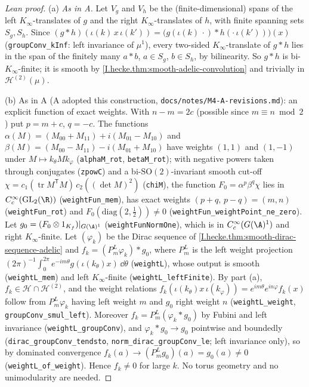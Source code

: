 \begin{proof}[Lean proof]
(a) \emph{As in A.} Let $V_g$ and $V_h$ be the (finite-dimensional) spans of the left $K_\infty$-translates of $g$ and the right $K_\infty$-translates of $h$, with finite spanning sets $S_g,S_h$. Since $(g\ast h)(\iota(k)\,x\,\iota(k'))=\bigl(g(\iota(k)\,\cdot)\ast h(\cdot\,\iota(k'))\bigr)(x)$ (\texttt{groupConv\_kInf}: left invariance of $\mu^1$), every two-sided $K_\infty$-translate of $g\ast h$ lies in the span of the finitely many $a\ast b$, $a\in S_g$, $b\in S_h$, by bilinearity. So $g\ast h$ is bi-$K_\infty$-finite; it is smooth by \cref{I.hecke.thm:smooth-adelic-convolution} and trivially in $\mathcal H^{(2)}(\mu)$.

(b) As in A (A adopted this construction, \texttt{docs/notes/M4-A-revisions.md}): an explicit function of exact weights. With $n-m=2c$ (possible since $m\equiv n \bmod 2$) put $p=m+c$, $q=-c$. The functions $\alpha(M)=(M_{00}+M_{11})+i(M_{01}-M_{10})$ and $\beta(M)=(M_{00}-M_{11})-i(M_{01}+M_{10})$ have weights $(1,1)$ and $(1,-1)$ under $M\mapsto k_\theta Mk_\varphi$ (\texttt{alphaM\_rot}, \texttt{betaM\_rot}); with negative powers taken through conjugates (\texttt{zpowC}) and a bi-$\mathrm{SO}(2)$-invariant smooth cut-off $\chi=c_1(\operatorname{tr}M^{\mathsf T}M)\,c_2((\det M)^2)$ (\texttt{chiM}), the function $F_0=\alpha^p\beta^q\chi$ lies in $C_c^\infty(\mathrm{GL}_2(\R))$ (\texttt{weightFun\_mem}), has exact weights $(p+q,\,p-q)=(m,n)$ (\texttt{weightFun\_rot}) and $F_0(\mathrm{diag}(2,\tfrac12))\ne0$ (\texttt{weightFun\_weightPoint\_ne\_zero}). Let $g_0=(F_0\otimes1_{K_f})|_{G(\A)^1}$ (\texttt{weightFunNormOne}), which is in $C_c^\infty(G(\A)^1)$ and right $K_\infty$-finite. Let $(\varphi_k)$ be the Dirac sequence of \cref{I.hecke.thm:smooth-dirac-sequence-adelic} and $f_k=(P^L_m\varphi_k)\ast g_0$, where $P^L_m$ is the left weight projection $(2\pi)^{-1}\int_0^{2\pi}e^{-im\theta}g(\iota(k_\theta)x)\,\dd\theta$ (\texttt{weightL}), whose output is smooth (\texttt{weightL\_mem}) and left $K_\infty$-finite (\texttt{weightL\_leftFinite}). By part (a), $f_k\in\mathcal H\cap\mathcal H^{(2)}$, and the weight relations $f_k(\iota(k_\theta)x\,\iota(k_\varphi))=e^{im\theta}e^{in\varphi}f_k(x)$ follow from $P^L_m\varphi_k$ having left weight $m$ and $g_0$ right weight $n$ (\texttt{weightL\_weight}, \texttt{groupConv\_smul\_left}). Moreover $f_k=P^L_m(\varphi_k\ast g_0)$ by Fubini and left invariance (\texttt{weightL\_groupConv}), and $\varphi_k\ast g_0\to g_0$ pointwise and boundedly (\texttt{dirac\_groupConv\_tendsto}, \texttt{norm\_dirac\_groupConv\_le}; left invariance only), so by dominated convergence $f_k(a)\to(P^L_mg_0)(a)=g_0(a)\neq0$ (\texttt{weightL\_of\_weight}). Hence $f_k\ne0$ for large $k$. No torus geometry and no unimodularity are needed.
\end{proof}

